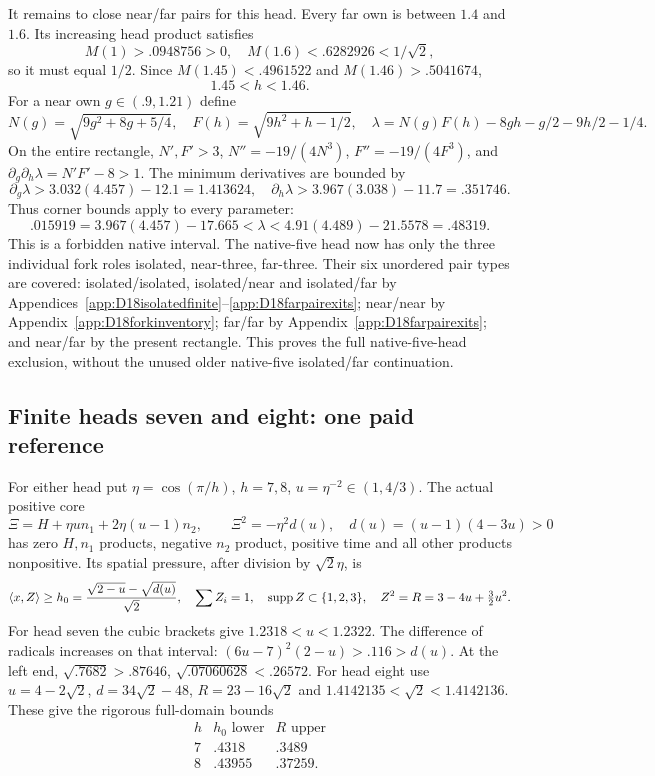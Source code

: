 \documentclass[11pt]{article}
\theoremstyle{definition}
\theoremstyle{remark}
\newcommand{\ip}[2]{\langle #1,#2\rangle}
\begin{document}
It remains to close near/far pairs for this head.
Every far own is between \(1.4\) and \(1.6\).
Its increasing head product satisfies
\[
 M(1)>.0948756>0,\quad M(1.6)<.6282926<1/\sqrt2,
\]
so it must equal \(1/2\).
Since \(M(1.45)<.4961522\) and \(M(1.46)>.5041674\),
\[
                              1.45<h<1.46 .
\]
For a near own \(g\in(.9,1.21)\) define
\[
 N(g)=\sqrt{9g^2+8g+5/4},\quad F(h)=\sqrt{9h^2+h-1/2},\quad
 \lambda=N(g)F(h)-8gh-g/2-9h/2-1/4 .
\]
On the entire rectangle,
\(N',F'>3\), \(N''=-19/(4N^3)\),
\(F''=-19/(4F^3)\), and
\(\partial_g\partial_h\lambda=N'F'-8>1\).
The minimum derivatives are bounded by
\[
 \partial_g\lambda>3.032(4.457)-12.1=1.413624,\quad
 \partial_h\lambda>3.967(3.038)-11.7=.351746 .
\]
Thus corner bounds apply to every parameter:
\[
 .015919=3.967(4.457)-17.665
       <\lambda<
 4.91(4.489)-21.5578=.48319 .
\]
This is a forbidden native interval.
The native-five head now has only the three individual fork roles
isolated, near-three, far-three.
Their six unordered pair types are covered:
isolated/isolated, isolated/near and isolated/far by
Appendices~\ref{app:D18isolatedfinite}--\ref{app:D18farpairexits};
near/near by Appendix~\ref{app:D18forkinventory};
far/far by Appendix~\ref{app:D18farpairexits};
and near/far by the present rectangle.
This proves the full native-five-head exclusion, without the
unused older native-five isolated/far continuation.

\subsection{Finite heads seven and eight: one paid reference}
\label{app:D18finite78reference}

For either head put \(\eta=\cos(\pi/h)\), \(h=7,8\),
\(u=\eta^{-2}\in(1,4/3)\).
The actual positive core
\[
 \Xi=H+\eta u n_1+2\eta(u-1)n_2,\qquad
 \Xi^2=-\eta^2d(u),\quad d(u)=(u-1)(4-3u)>0
\]
has zero \(H,n_1\) products, negative \(n_2\) product,
positive time and all other products nonpositive.
Its spatial pressure, after division by \(\sqrt2\eta\), is
\[
 \ip xZ\ge h_0={\sqrt{2-u}-\sqrt{d(u)}\over\sqrt2},\quad
 \sum Z_i=1,\quad
 \operatorname{supp}Z\subset\{1,2,3\},\quad
 Z^2=R=3-4u+\tfrac32u^2 .
\]
For head seven the cubic brackets give
\(1.2318<u<1.2322\).
The difference of radicals increases on that interval:
\((6u-7)^2(2-u)>.116>d(u)\).
At the left end,
\(\sqrt{.7682}>.87646\), \(\sqrt{.07060628}<.26572\).
For head eight use
\(u=4-2\sqrt2\), \(d=34\sqrt2-48\), \(R=23-16\sqrt2\)
and \(1.4142135<\sqrt2<1.4142136\).
These give the rigorous full-domain bounds
\[
 \begin{array}{c|cc}
 h&h_0\text{ lower}&R\text{ upper}\\ \hline
 7&.4318&.3489\\
 8&.43955&.37259 .
 \end{array}
\]
\end{document}
